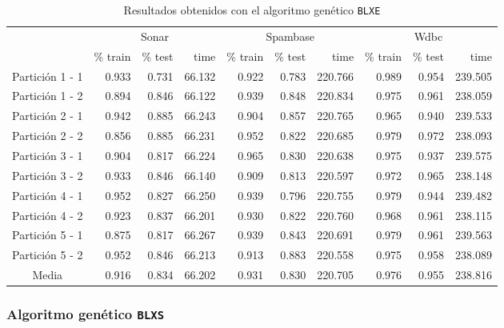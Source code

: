 \documentclass[11pt]{article}
\theoremstyle{plain}
\theoremstyle{definition}
\begin{document}
\begin{table}[H]
\centering
\caption{Resultados obtenidos con el algoritmo genético \texttt{BLXE}}
\label{tbl-blxe}
\begin{tabular}{@{}crrrrrrrrr@{}}
  \toprule
  & \multicolumn{3}{c}{Sonar} & \multicolumn{3}{c}{Spambase} & \multicolumn{3}{c}{Wdbc}  \\
  \cmidrule(r){2-10}
           & \% train & \% test & time & \% train   & \% test   & time & \% train & \% test & time \\
  \midrule
Partición 1 - 1      & 0.933 & 0.731 & 66.132 & 0.922 & 0.783 & 220.766 & 0.989 & 0.954 & 239.505 \\
Partición 1 - 2      & 0.894 & 0.846 & 66.122 & 0.939 & 0.848 & 220.834 & 0.975 & 0.961 & 238.059 \\
Partición 2 - 1      & 0.942 & 0.885 & 66.243 & 0.904 & 0.857 & 220.765 & 0.965 & 0.940 & 239.533 \\
Partición 2 - 2      & 0.856 & 0.885 & 66.231 & 0.952 & 0.822 & 220.685 & 0.979 & 0.972 & 238.093 \\
Partición 3 - 1      & 0.904 & 0.817 & 66.224 & 0.965 & 0.830 & 220.638 & 0.975 & 0.937 & 239.575 \\
Partición 3 - 2      & 0.933 & 0.846 & 66.140 & 0.909 & 0.813 & 220.597 & 0.972 & 0.965 & 238.148 \\
Partición 4 - 1      & 0.952 & 0.827 & 66.250 & 0.939 & 0.796 & 220.755 & 0.979 & 0.944 & 239.482 \\
Partición 4 - 2      & 0.923 & 0.837 & 66.201 & 0.930 & 0.822 & 220.760 & 0.968 & 0.961 & 238.115 \\
Partición 5 - 1      & 0.875 & 0.817 & 66.267 & 0.939 & 0.843 & 220.691 & 0.979 & 0.961 & 239.563 \\
Partición 5 - 2      & 0.952 & 0.846 & 66.213 & 0.913 & 0.883 & 220.558 & 0.975 & 0.958 & 238.089 \\
  \bottomrule
Media                & 0.916 & 0.834 & 66.202 & 0.931 & 0.830 & 220.705 & 0.976 & 0.955 & 238.816 \\
\end{tabular}
\end{table}

\subsubsection{Algoritmo genético \texttt{BLXS}}
\end{document}
